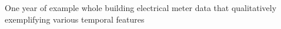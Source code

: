 One year of example whole building electrical meter data that qualitatively exemplifying various temporal features
